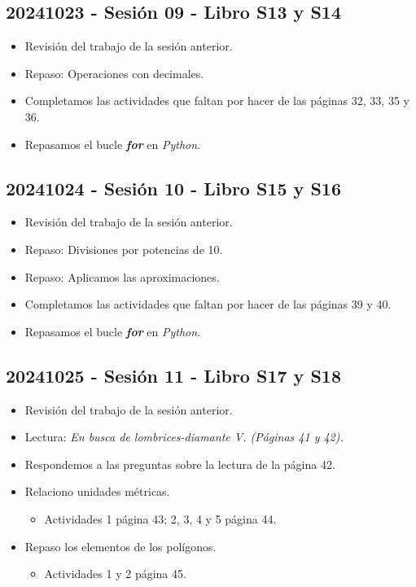 \documentclass[a4paper,12pt]{article}
\begin{document}
\subsection{20241023 - Sesión 09 - Libro S13 y S14}

\begin{itemize}
    \item Revisión del trabajo de la sesión anterior.
    \item Repaso: Operaciones con decimales.
    \item Completamos las actividades que faltan por hacer de las páginas 32, 33, 35 y 36.
    \item Repasamos el bucle \textbf{\textit{for}} en \textit{Python}.
\end{itemize}

\subsection{20241024 - Sesión 10 - Libro S15 y S16}

\begin{itemize}
    \item Revisión del trabajo de la sesión anterior.
    \item Repaso: Divisiones por potencias de 10.
    \item Repaso: Aplicamos las aproximaciones.
    \item Completamos las actividades que faltan por hacer de las páginas 39 y 40.
    \item Repasamos el bucle \textbf{\textit{for}} en \textit{Python}.
\end{itemize}

\subsection{20241025 - Sesión 11 - Libro S17 y S18}

\begin{itemize}
    \item Revisión del trabajo de la sesión anterior.
    \item Lectura: \textit{En busca de lombrices-diamante V. (Páginas 41 y 42).}
    \item Respondemos a las preguntas sobre la lectura de la página 42.
    \item Relaciono unidades métricas.
    \begin{itemize}
        \item Actividades 1 página 43; 2, 3, 4 y 5 página 44.
    \end{itemize}
    \item Repaso los elementos de los polígonos.
    \begin{itemize}
        \item Actividades 1 y 2 página 45.
    \end{itemize}
\end{itemize}
\end{document}
